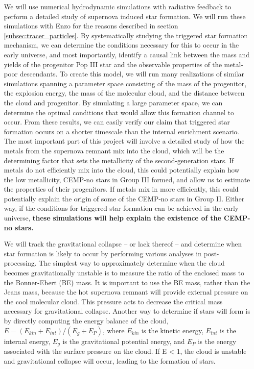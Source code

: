 \documentclass[a4paper, 12pt]{article}
\begin{document}
We will use numerical hydrodynamic simulations with radiative feedback to perform a detailed study of supernova induced star formation. We will run these simulations with Enzo for the reasons described in section \ref{subsec:tracer_particles}. By systematically studying the triggered star formation mechanism, we can determine the conditions necessary for this to occur in the early universe, and most importantly, identify a causal link between the mass and yields of the progenitor Pop III star and the observable properties of the metal-poor descendants. To create this model, we will run many realizations of similar simulations spanning a parameter space consisting of the mass of the progenitor, the explosion energy, the mass of the molecular cloud, and the distance between the cloud and progenitor. By simulating a large parameter space, we can determine the optimal conditions that would allow this formation channel to occur. From these results, we can easily verify our claim that triggered star formation occurs on a shorter timescale than the internal enrichment scenario. The most important part of this project will involve a detailed study of how the metals from the supernova remnant mix into the cloud, which will be the determining factor that sets the metallicity of the second-generation stars. If metals do not efficiently mix into the cloud, this could potentially explain how the low metallicity, CEMP-no stars in Group III formed, and allow us to estimate the properties of their progenitors. If metals mix in more efficiently, this could potentially explain the origin of some of the CEMP-no stars in Group II. Either way, if the conditions for triggered star formation can be achieved in the early universe, \textbf{these simulations will help explain the existence of the CEMP-no stars.}

We will track the gravitational collapse -- or lack thereof -- and determine when star formation is likely to occur by performing various analyses in post-processing. The simplest way to approximately determine when the cloud becomes gravitationally unstable is to measure the ratio of the enclosed mass to the Bonner-Ebert (BE) mass. It is important to use the BE mass, rather than the Jeans mass, because the hot supernova remnant will provide external pressure on the cool molecular cloud. This pressure acts to decrease the critical mass necessary for gravitational collapse. Another way to determine if stars will form is by directly computing the energy balance of the cloud, $E = (E_{kin} + E_{int}) / (E_{g} + E_{P})$, where $E_{kin}$ is the kinetic energy, $E_{int}$ is the internal energy, $E_{g}$ is the gravitational potential energy, and $E_{P}$ is the energy associated with the surface pressure on the cloud. If E < 1, the cloud is unstable and gravitational collapse will occur, leading to the formation of stars.
\end{document}
